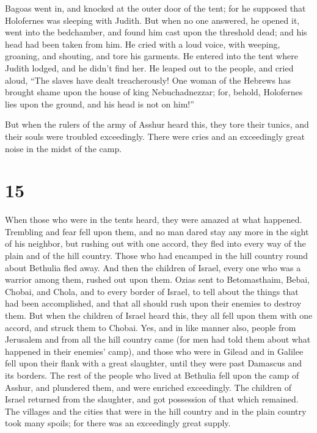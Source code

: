  Bagoas went in, and knocked at the outer door of the
tent; for he supposed that Holofernes was sleeping with Judith.
 But when no one answered, he opened it, went into the
bedchamber, and found him cast upon the threshold dead; and his head had
been taken from him.  He cried with a loud voice, with
weeping, groaning, and shouting, and tore his garments. 
He entered into the tent where Judith lodged, and he didn't find her. He
leaped out to the people, and cried aloud,  ``The slaves
have dealt treacherously! One woman of the Hebrews has brought shame
upon the house of king Nebuchadnezzar; for, behold, Holofernes lies upon
the ground, and his head is not on him!''

 But when the rulers of the army of Asshur heard this,
they tore their tunics, and their souls were troubled exceedingly. There
were cries and an exceedingly great noise in the midst of the camp.

\hypertarget{section-14}{%
\section{15}\label{section-14}}

 When those who were in the tents heard, they were amazed
at what happened.  Trembling and fear fell upon them, and
no man dared stay any more in the sight of his neighbor, but rushing out
with one accord, they fled into every way of the plain and of the hill
country.  Those who had encamped in the hill country round
about Bethulia fled away. And then the children of Israel, every one who
was a warrior among them, rushed out upon them.  Ozias
sent to Betomasthaim, Bebai, Chobai, and Chola, and to every border of
Israel, to tell about the things that had been accomplished, and that
all should rush upon their enemies to destroy them.  But
when the children of Israel heard this, they all fell upon them with one
accord, and struck them to Chobai. Yes, and in like manner also, people
from Jerusalem and from all the hill country came (for men had told them
about what happened in their enemies' camp), and those who were in
Gilead and in Galilee fell upon their flank with a great slaughter,
until they were past Damascus and its borders.  The rest
of the people who lived at Bethulia fell upon the camp of Asshur, and
plundered them, and were enriched exceedingly.  The
children of Israel returned from the slaughter, and got possession of
that which remained. The villages and the cities that were in the hill
country and in the plain country took many spoils; for there was an
exceedingly great supply.

